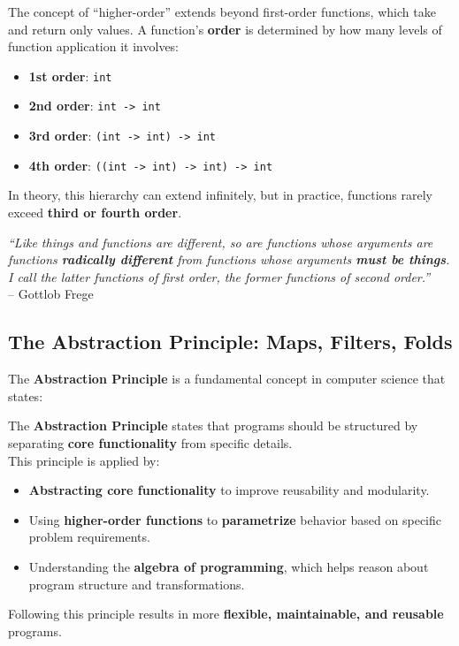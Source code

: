 \newpage 


\begin{Def}
    
    The concept of ``higher-order'' extends beyond first-order functions, which take and return only values. A function's \textbf{order} is determined by how many levels of function application it involves:
    \begin{itemize}
        \item \textbf{1st order}: \texttt{int}
        \item \textbf{2nd order}: \texttt{int -> int}
        \item \textbf{3rd order}: \texttt{(int -> int) -> int}
        \item \textbf{4th order}: \texttt{((int -> int) -> int) -> int}
    \end{itemize}
    
    In theory, this hierarchy can extend infinitely, but in practice, functions rarely exceed \textbf{third or fourth order}.
\end{Def}

\begin{Tip}
    \textit{``Like things and functions are different, so are functions whose arguments are functions 
    \textbf{radically different} from functions whose arguments \textbf{must be things}. 
    I call the latter functions of first order, the former functions of second order.''}\\

    \noindent
    -- Gottlob Frege
\end{Tip}

\subsection{The Abstraction Principle: Maps, Filters, Folds}
The \textbf{Abstraction Principle} is a fundamental concept in computer science that states:
\begin{Def}

    The \textbf{Abstraction Principle} states that programs should be structured by separating \textbf{core functionality} from specific details.\\

    \noindent
    This principle is applied by:
    \begin{itemize}
        \item \textbf{Abstracting core functionality} to improve reusability and modularity.
        \item Using \textbf{higher-order functions} to \textbf{parametrize} behavior based on specific problem requirements.
        \item Understanding the \textbf{algebra of programming}, which helps reason about program structure and transformations.
    \end{itemize}

    \noindent
    Following this principle results in more \textbf{flexible, maintainable, and reusable} programs.
\end{Def}

